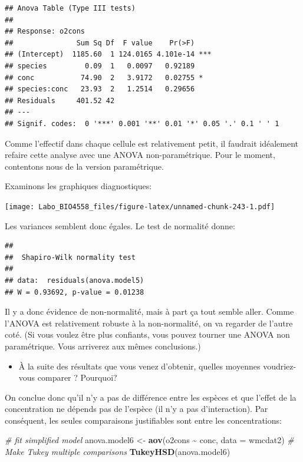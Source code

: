 \documentclass[
  12pt,
]{book}
\newenvironment{Shaded}{\begin{snugshade}}{\end{snugshade}}
\newcommand{\CommentTok}[1]{\textcolor[rgb]{0.56,0.35,0.01}{\textit{#1}}}
\newcommand{\DataTypeTok}[1]{\textcolor[rgb]{0.13,0.29,0.53}{#1}}
\newcommand{\KeywordTok}[1]{\textcolor[rgb]{0.13,0.29,0.53}{\textbf{#1}}}
\newcommand{\NormalTok}[1]{#1}
\newcommand{\OperatorTok}[1]{\textcolor[rgb]{0.81,0.36,0.00}{\textbf{#1}}}
\newcommand{\StringTok}[1]{\textcolor[rgb]{0.31,0.60,0.02}{#1}}
\providecommand{\tightlist}{%
  \setlength{\itemsep}{0pt}\setlength{\parskip}{0pt}}
\begin{document}
\begin{verbatim}
## Anova Table (Type III tests)
## 
## Response: o2cons
##               Sum Sq Df  F value    Pr(>F)    
## (Intercept)  1185.60  1 124.0165 4.101e-14 ***
## species         0.09  1   0.0097   0.92189    
## conc           74.90  2   3.9172   0.02755 *  
## species:conc   23.93  2   1.2514   0.29656    
## Residuals     401.52 42                       
## ---
## Signif. codes:  0 '***' 0.001 '**' 0.01 '*' 0.05 '.' 0.1 ' ' 1
\end{verbatim}

Comme l'effectif dans chaque cellule est relativement petit, il faudrait idéalement refaire cette analyse avec une ANOVA non-paramétrique. Pour le moment, contentons nous de la version paramétrique.

Examinons les graphiques diagnostiques:

\texttt{[image: Labo\_BIO4558\_files/figure-latex/unnamed-chunk-243-1.pdf]}

Les variances semblent donc égales. Le test de normalité donne:

\begin{verbatim}
## 
##  Shapiro-Wilk normality test
## 
## data:  residuals(anova.model5)
## W = 0.93692, p-value = 0.01238
\end{verbatim}

Il y a donc évidence de non-normalité, mais à part ça tout semble aller. Comme l'ANOVA est relativement robuste à la non-normalité, on va regarder de l'autre coté. (Si vous voulez être plus confiants, vous pouvez tourner une ANOVA non paramétrique. Vous arriverez aux mêmes conclusions.)

\begin{itemize}
\tightlist
\item
  À la suite des résultats que vous venez d'obtenir, quelles moyennes voudriez-vous comparer ? Pourquoi?
\end{itemize}

On conclue donc qu'il n'y a pas de différence entre les espèces et que l'effet de la concentration ne dépends pas de l'espèce (il n'y a pas d'interaction). Par conséquent, les seules comparaisons justifiables sont entre les concentrations:

\begin{Shaded}
\begin{Highlighting}[]
\CommentTok{\# fit simplified model}
\NormalTok{anova.model6 \textless{}{-}}\StringTok{ }\KeywordTok{aov}\NormalTok{(o2cons }\OperatorTok{\textasciitilde{}}\StringTok{ }\NormalTok{conc, }\DataTypeTok{data =}\NormalTok{ wmcdat2)}
\CommentTok{\# Make Tukey multiple comparisons}
\KeywordTok{TukeyHSD}\NormalTok{(anova.model6)}
\end{Highlighting}
\end{Shaded}
\end{document}
